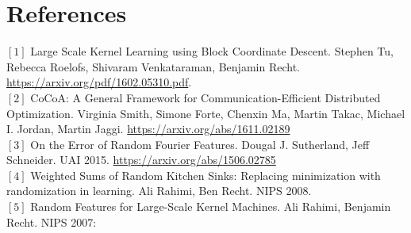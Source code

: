 \documentclass[12pt]{article}
\begin{document}
\section{References}
\noindent$[1]$ Large Scale Kernel Learning using Block Coordinate Descent.
Stephen Tu, Rebecca Roelofs, Shivaram Venkataraman, Benjamin Recht. \url{https://arxiv.org/pdf/1602.05310.pdf}. \\
$[2]$ CoCoA: A General Framework for Communication-Efficient Distributed Optimization.
Virginia Smith, Simone Forte, Chenxin Ma, Martin Takac, Michael I. Jordan, Martin Jaggi.  \url{https://arxiv.org/abs/1611.02189} \\
$[3]$ On the Error of Random Fourier Features. Dougal J. Sutherland, Jeff Schneider. UAI 2015. \url{https://arxiv.org/abs/1506.02785}\\
$[4]$ Weighted Sums of Random Kitchen Sinks: Replacing minimization with randomization in learning. Ali Rahimi, Ben Recht. NIPS 2008.\\
$[5]$	Random Features for Large-Scale Kernel Machines. Ali Rahimi, Benjamin Recht. NIPS 2007:
\end{document}
